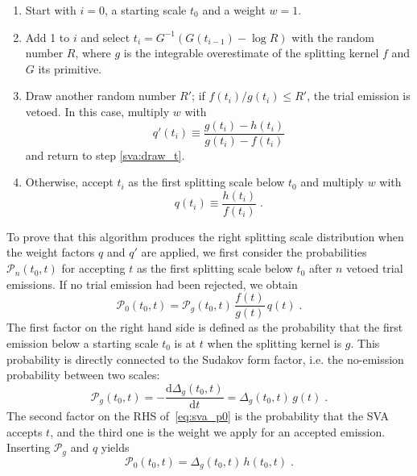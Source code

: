 \documentclass[a4paper]{scrartcl}
\newcommand{\tvar}{\ensuremath{t}\xspace}
\newcommand{\diff}{\ensuremath{\text{d}}\xspace}
\begin{document}
\begin{enumerate}
    \item Start with $i=0$, a starting scale $\tvar_0$ and a weight $w=1$.
    \item Add 1 to $i$ and select $\tvar_i = G^{-1}\left(G(\tvar_{i-1}) - \log
        R \right)$ with the random number $R$, where $g$ is the integrable
        overestimate of the splitting kernel $f$ and $G$ its primitive.
        \label{sva:draw_t}
    \item Draw another random number $R'$; if $f(\tvar_i)/g(\tvar_i) \leq R'$,
    the trial emission is vetoed. In this case, multiply $w$ with 
    \begin{equation*}
        q'(\tvar_i) \equiv \frac{g(\tvar_i) - h(\tvar_i)}%
        {g(\tvar_i) - f(\tvar_i)}
    \end{equation*}
    and return to step \ref{sva:draw_t}.
    \item Otherwise, accept $\tvar_i$ as the first splitting scale below
        $\tvar_0$ and multiply $w$ with
    \begin{equation*}
        q(\tvar_i) \equiv \frac{h(\tvar_i)}{f(\tvar_i)}\;.
    \end{equation*}
\end{enumerate}

To prove that this algorithm produces the right splitting scale distribution
when the weight factors $q$ and $q'$ are applied, we first consider the
probabilities $\mathcal{P}_n(\tvar_0, \tvar)$ for accepting $\tvar$ as the first
splitting scale below $\tvar_0$ after $n$ vetoed trial emissions. If no trial
emission had been rejected, we obtain
\begin{equation}
    \label{eq:sva_p0}
    \mathcal{P}_0(\tvar_0, \tvar)
    = \mathcal{P}_g(\tvar_0, \tvar) \, \frac{f(\tvar)}{g(\tvar)} \, q(\tvar)\;.
\end{equation}
The first factor on the right hand side is defined as the probability that the
first emission below a starting scale $\tvar_0$ is at $\tvar$ when the
splitting kernel is $g$.  This probability is directly connected to the Sudakov
form factor, i.e. the no-emission probability between two scales:
\begin{equation}
    \mathcal{P}_g(\tvar_0, \tvar)
    = - \frac{\diff \Delta_g(\tvar_0, \tvar)}{\diff \tvar}
    = \Delta_g(\tvar_0, \tvar)\,g(\tvar)\;.
\end{equation}
The second factor on the RHS of~\eqref{eq:sva_p0} is the probability that the
SVA accepts $\tvar$, and the third one is the weight we apply for an accepted
emission. Inserting $\mathcal{P}_g$ and $q$ yields
\begin{equation}
    \mathcal{P}_0(\tvar_0, \tvar)
    = \Delta_g(\tvar_0, \tvar)\,h(\tvar_0, \tvar)\;.
\end{equation}
\end{document}
